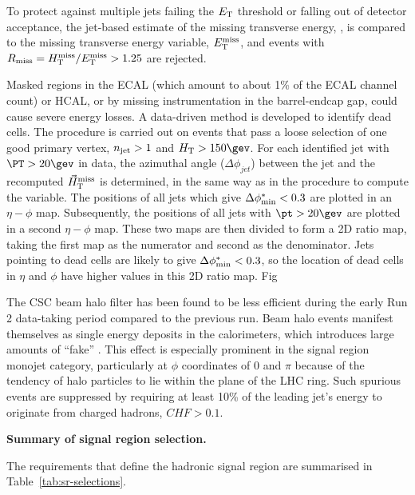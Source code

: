 To protect against multiple jets failing the ${E_{\text T}}$ threshold or falling out of detector acceptance, the jet-based
estimate of the missing transverse energy, \mht, is compared to the missing transverse energy variable, $\mbox{$E_\text{T}^{\rm miss}$}$, and events with $R_{\rm
  miss}=\mbox{$H_{\rm T}^{\rm miss}$}/\mbox{$E_\text{T}^{\rm miss}$} > 1.25$ are rejected. 
  
Masked regions in the ECAL (which amount to about 1\% of the ECAL channel count)
or HCAL, or by missing instrumentation in the barrel-endcap gap, could cause 
severe energy losses. A data-driven method is developed to identify dead cells. The 
procedure is carried out on events that pass a loose selection of one good primary vertex,
$n_{\text{jet}}>1$ and $\scalht>150\gev$. For each identified jet with $\PT > 20 \gev$ in data, the azimuthal angle ($\Delta\phi_{jet}$) between the jet and the 
recomputed ${\mbox{$\vec{H}_{\rm T}^{\rm miss}$}}$ is determined, in the same way as in the procedure to compute the \bdphi 
variable. The positions of all jets which give $\mbox{$\Delta\phi^{*}_{\rm min}$} < 0.3$ are plotted in an $\eta-\phi$ map. Subsequently, the positions of all jets with
$\pt>20\gev$ are plotted in a second $\eta-\phi$ map. These two maps are then divided to form a 2D ratio map, taking the
first map as the numerator and second as the denominator. Jets pointing to dead cells are likely to give $\mbox{$\Delta\phi^{*}_{\rm min}$} < 0.3$, so the
location of dead cells in $\eta$ and $\phi$ have higher values in this 2D ratio map. Fig



The CSC beam halo filter has been found to be less efficient during the early Run 2 data-taking period compared to the previous run.
Beam halo events manifest themselves as single energy deposits in the calorimeters, which introduces large amounts of ``fake'' \met. This effect is
especially prominent in the signal region monojet category, particularly at $\phi$ coordinates of 0 and $\pi$ because of the tendency of halo particles to
lie within the plane of the LHC ring. 
Such spurious events are suppressed by requiring at least 10\% of the leading jet's energy to originate from charged hadrons, $CHF>0.1$. 

{\bf Summary of signal region selection.} 

The requirements that define the hadronic signal region are summarised
in Table~\ref{tab:sr-selections}.

